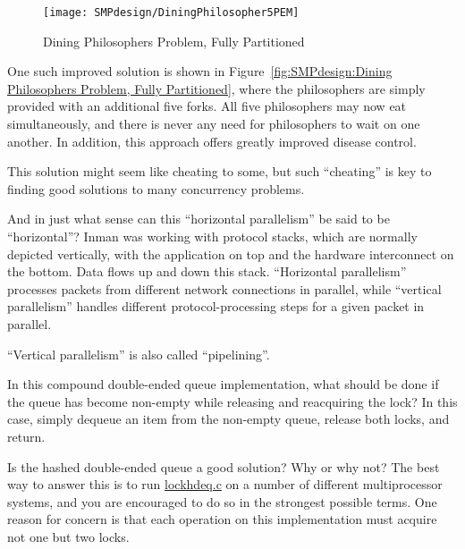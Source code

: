 \begin{figure}[tb]
\begin{center}
\texttt{[image: SMPdesign/DiningPhilosopher5PEM]}
\end{center}
\caption{Dining Philosophers Problem, Fully Partitioned}
\end{figure}

	One such improved solution is shown in
	Figure~\ref{fig:SMPdesign:Dining Philosophers Problem, Fully Partitioned},
	where the philosophers are simply provided with an additional
	five forks.
	All five philosophers may now eat simultaneously, and there
	is never any need for philosophers to wait on one another.
	In addition, this approach offers greatly improved disease control.

	This solution might seem like cheating to some, but such
	``cheating'' is key to finding good solutions to many
	concurrency problems.

\QuickQ{}
	And in just what sense can this ``horizontal parallelism'' be
	said to be ``horizontal''?
\QuickA{}
	Inman was working with protocol stacks, which are normally
	depicted vertically, with the application on top and the
	hardware interconnect on the bottom.
	Data flows up and down this stack.
	``Horizontal parallelism'' processes packets from different network
	connections in parallel, while ``vertical parallelism''
	handles different protocol-processing steps for a given
	packet in parallel.

	``Vertical parallelism'' is also called ``pipelining''.

\QuickQ{}
	In this compound double-ended queue implementation, what should
	be done if the queue has become non-empty while releasing
	and reacquiring the lock?
\QuickA{}
	In this case, simply dequeue an item from the non-empty
	queue, release both locks, and return.

\QuickQ{}
	Is the hashed double-ended queue a good solution?
	Why or why not?
\QuickA{}
	The best way to answer this is to run \url{lockhdeq.c} on
	a number of different multiprocessor systems, and you are
	encouraged to do so in the strongest possible terms.
	One reason for concern is that each operation on this
	implementation must acquire not one but two locks.

